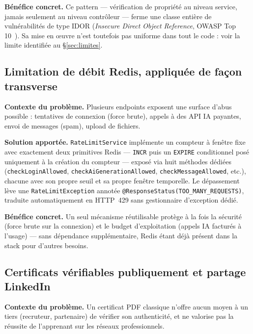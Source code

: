 \textbf{Bénéfice concret.} Ce pattern --- vérification de propriété au
niveau service, jamais seulement au niveau contrôleur --- ferme une classe
entière de vulnérabilités de type IDOR (\emph{Insecure Direct Object
Reference}, OWASP Top 10~\cite{owasp-top10}). Sa mise en \oe uvre n'est
toutefois pas uniforme dans tout le code : voir la limite identifiée au
\S\ref{sec:limites}.

\subsection{Limitation de débit Redis, appliquée de façon transverse}
\label{sec:rate-limiting}

\textbf{Contexte du problème.} Plusieurs endpoints exposent une surface
d'abus possible : tentatives de connexion (force brute), appels à des API
IA payantes, envoi de messages (spam), upload de fichiers.

\textbf{Solution apportée.} \texttt{RateLimitService} implémente un
compteur à fenêtre fixe avec exactement deux primitives Redis --- \texttt{INCR}
puis un \texttt{EXPIRE} conditionnel posé uniquement à la création du
compteur --- exposé via huit méthodes dédiées
(\texttt{checkLoginAllowed}, \texttt{checkAiGenerationAllowed},
\texttt{checkMessageAllowed}, etc.), chacune avec son propre seuil et sa
propre fenêtre temporelle. Le dépassement lève une
\texttt{RateLimitException} annotée \texttt{@ResponseStatus(TOO\_MANY\_REQUESTS)},
traduite automatiquement en HTTP~429 sans gestionnaire d'exception dédié.

\textbf{Bénéfice concret.} Un seul mécanisme réutilisable protège à la
fois la sécurité (force brute sur la connexion) et le budget
d'exploitation (appels IA facturés à l'usage) --- sans dépendance
supplémentaire, Redis étant déjà présent dans la stack pour d'autres
besoins.

\subsection{Certificats vérifiables publiquement et partage LinkedIn}
\label{sec:certificat-linkedin}

\textbf{Contexte du problème.} Un certificat PDF classique n'offre aucun
moyen à un tiers (recruteur, partenaire) de vérifier son authenticité, et
ne valorise pas la réussite de l'apprenant sur les réseaux professionnels.

